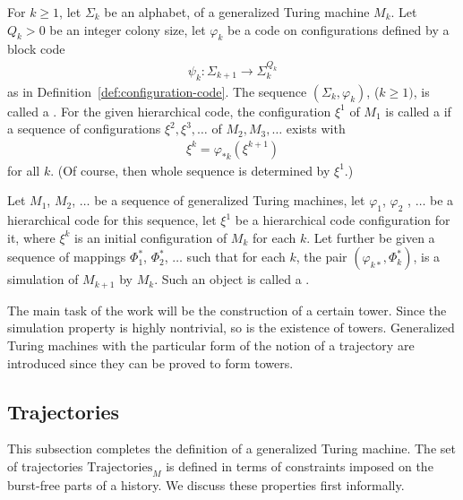 \documentclass[11pt]{memoir}
\theoremstyle{definition} %
\renewcommand{\ge}{\geq}
\newcommand{\Q}{Q}
\newcommand{\Trajectories}{\mathrm{Trajectories}}
\begin{document}
\begin{definition}\label{def:hierarchical-code}
For \( k\ge 1 \), let \( \Sigma_{k} \) be an alphabet, of a generalized Turing machine \( M_{k} \).
Let \( \Q_{k}>0 \) be an integer colony size, let \( \varphi_{k} \)
be a code on configurations defined by a block code
  \begin{align*}
       \psi_{k}: \Sigma_{k+1}\to \Sigma_{k}^{\Q_{k}}
  \end{align*}
as in Definition~\ref{def:configuration-code}.
The sequence \( (\Sigma_{k},\varphi_{k}) \), (\( k\ge 1) \),  is
called a .
For the given hierarchical code, the configuration \( \xi^{1} \) of \( M_{1} \)
is called a  if a sequence
of configurations \( \xi^{2},\xi^{3},\dots \) of \( M_{2},M_{3},\dots \) exists with
\begin{align*}
 \xi^{k}=\varphi_{*k}(\xi^{k+1})
 \end{align*} 
for all \( k \).
(Of course, then whole sequence is determined by \( \xi^{1} \).)

Let \( M_{1} \), \( M_{2} \), \( \dots\) be a sequence of generalized Turing machines,
let \( \varphi_{1} \), \( \varphi_{2} \) , \(\dots \) be a hierarchical code for this sequence,
let \( \xi^{1} \) be a hierarchical code configuration for it, where \( \xi^{k} \) is an
initial configuration of \( M_{k} \) for each \( k \).
Let further be given a sequence of mappings \( \Phi^{*}_{1} \), \( \Phi^{*}_{2} \), \( \dots \) 
such that for each \( k \), the pair \( (\varphi_{k*},\Phi_{k}^{*}) \),
is a simulation of \( M_{k+1} \) by \( M_{k} \).
Such an object is called a .
\end{definition}

The main task of the work will be the construction of a certain tower.
Since the simulation property is highly nontrivial, so is the existence of towers.
Generalized Turing machines with the particular form of the notion of
a trajectory are introduced since they can be proved to form towers. 

\subsection{Trajectories}\label{sec:traj}

This subsection completes the definition of a generalized Turing machine.
The set of trajectories \( \Trajectories_{M} \) 
is defined in terms of constraints imposed on the burst-free parts of a history.
We discuss these properties first informally.
\end{document}
